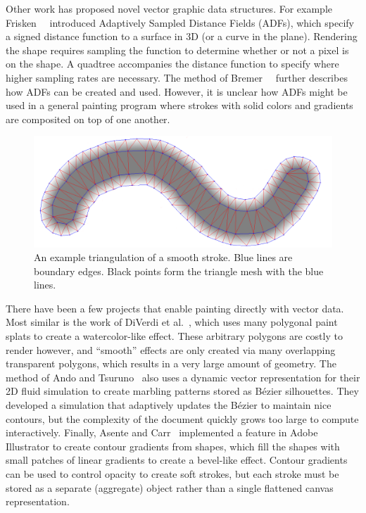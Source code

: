 \documentclass[review]{acmsiggraph}
\begin{document}
Other work has proposed novel vector graphic data structures. For example 
Frisken~\etal~
introduced Adaptively Sampled Distance Fields (ADFs), which specify a signed distance function to a surface in 3D
(or a curve in the plane).
%
Rendering the shape requires sampling the function to determine whether or not a pixel is on the shape.
A quadtree accompanies the distance function to specify where higher sampling rates are necessary. The method of Bremer~\etal~
further describes how ADFs can be created and used. However, it is unclear how ADFs might be used in a general
painting program where strokes with solid colors and gradients are composited on top of one another.

\begin{figure}
    \centering
        \includegraphics[width=\columnwidth]{images/stroke}
    \caption{An example triangulation of a smooth stroke. Blue lines are boundary edges. Black points form the triangle
    mesh with the blue lines.}
    \label{fig:stroke}
\end{figure}

There have been a few projects that enable painting directly with vector data.  Most similar is the work of DiVerdi et al.~, which uses many polygonal paint splats to create a watercolor-like effect.  These arbitrary polygons are costly to render however, and ``smooth'' effects are only created via many overlapping transparent polygons, which results in a very large amount of geometry. The method of Ando and Tsuruno~ also uses a dynamic vector representation for their 2D fluid simulation to create marbling patterns stored as B\'{e}zier silhouettes.  They developed a simulation that adaptively updates the B\'{e}zier to maintain nice contours, but the complexity of the document quickly grows too large to compute interactively.  Finally, Asente and Carr~ implemented a feature in Adobe Illustrator to create contour gradients from shapes, which fill the shapes with small patches of linear gradients to create a bevel-like effect.  Contour gradients can be used to control opacity to create soft strokes, but each stroke must be stored as a separate (aggregate) object rather than a single flattened canvas representation.
\end{document}
